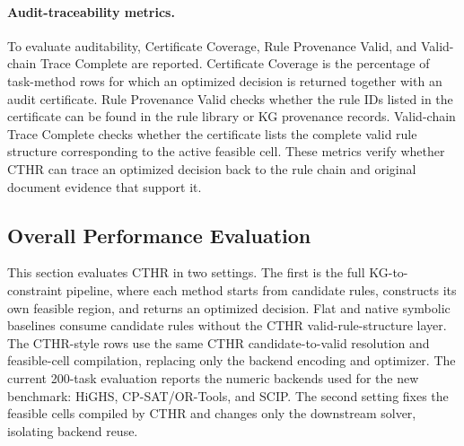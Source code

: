 ﻿\documentclass[a4paper,fleqn]{cas-dc}
\newcommand{\CTHR}{\textsc{CTHR}}
\begin{document}
\paragraph{Audit-traceability metrics.}
To evaluate auditability, Certificate Coverage, Rule Provenance Valid, and Valid-chain Trace Complete are reported. Certificate Coverage is the percentage of task-method rows for which an optimized decision is returned together with an audit certificate. Rule Provenance Valid checks whether the rule IDs listed in the certificate can be found in the rule library or KG provenance records. Valid-chain Trace Complete checks whether the certificate lists the complete valid rule structure corresponding to the active feasible cell. These metrics verify whether CTHR can trace an optimized decision back to the rule chain and original document evidence that support it.

\subsection{Overall Performance Evaluation}
\label{sec:overall_perf}

This section evaluates \CTHR{} in two settings. The first is the full
KG-to-constraint pipeline, where each method starts from candidate rules,
constructs its own feasible region, and returns an optimized decision. Flat
and native symbolic baselines consume candidate rules without the \CTHR{}
valid-rule-structure layer. The \CTHR{}-style rows use the same \CTHR{}
candidate-to-valid resolution and feasible-cell compilation, replacing only
the backend encoding and optimizer. The current 200-task evaluation reports
the numeric backends used for the new benchmark: HiGHS, CP-SAT/OR-Tools, and
SCIP. The second setting fixes the feasible cells compiled by \CTHR{} and
changes only the downstream solver, isolating backend reuse.
\end{document}

